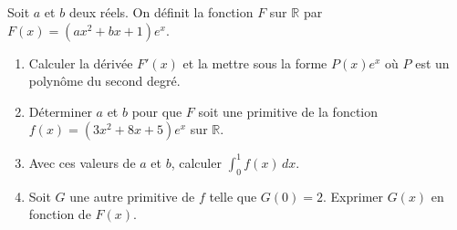\documentclass[11pt]{article}
\begin{document}
\begin{exercice}
Soit $a$ et $b$ deux réels. On définit la fonction $F$ sur $\mathbb{R}$ par $F(x) = (ax^2 + bx + 1)e^{x}$.
\begin{enumerate}
    \item Calculer la dérivée $F'(x)$ et la mettre sous la forme $P(x)e^{x}$ où $P$ est un polynôme du second degré.
    \item Déterminer $a$ et $b$ pour que $F$ soit une primitive de la fonction $f(x) = (3x^2 + 8x + 5)e^{x}$ sur $\mathbb{R}$.
    \item Avec ces valeurs de $a$ et $b$, calculer $\displaystyle\int_0^1 f(x)\,dx$.
    \item Soit $G$ une autre primitive de $f$ telle que $G(0) = 2$. Exprimer $G(x)$ en fonction de $F(x)$.
\end{enumerate}
\end{exercice}
\end{document}
